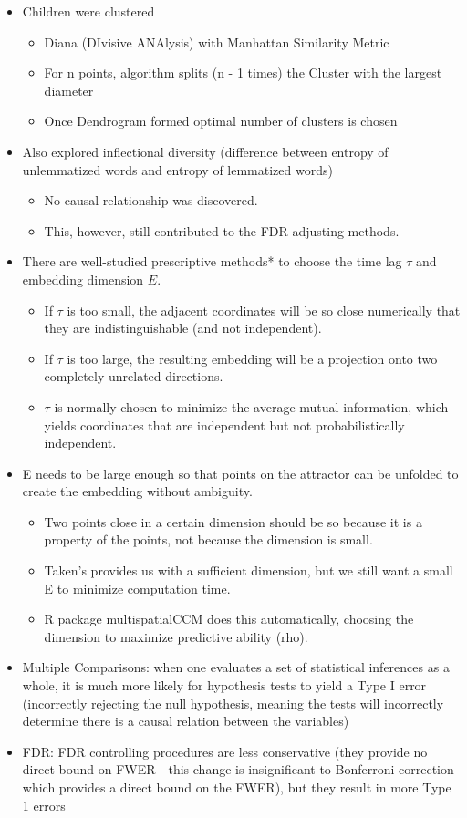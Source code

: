 \documentclass[10pt,a4paper]{article}
\begin{document}
\begin{itemize}
\item Children were clustered
\begin{itemize}
\item Diana (DIvisive ANAlysis) with Manhattan Similarity Metric
\item For n points, algorithm splits (n - 1 times) the Cluster with the largest diameter
\item Once Dendrogram formed optimal number of clusters is chosen
\end{itemize}
\item Also explored inflectional diversity (difference between entropy of unlemmatized words and entropy of lemmatized words)
\begin{itemize}
\item No causal relationship was discovered.
\item This, however, still contributed to the FDR adjusting methods.
\end{itemize}
\item There are well-studied prescriptive methods* to choose the time lag $\tau$ and embedding dimension $E$.
\begin{itemize}
\item If $\tau$ is too small, the adjacent coordinates will be so close numerically that they are indistinguishable (and not independent).
\item If $\tau$ is too large, the resulting embedding will be a projection onto two completely unrelated directions.
\item $\tau$ is normally chosen to minimize the average mutual information, which yields coordinates that are independent but not probabilistically independent.
\end{itemize}
\item E needs to be large enough so that points on the attractor can be unfolded to create the embedding without ambiguity.
\begin{itemize}
\item Two points close in a certain dimension should be so because it is a property of the points, not because the dimension is small.
\item Taken’s provides us with a sufficient dimension, but we still want a small E to minimize computation time.
\item R package multispatialCCM does this automatically, choosing the dimension to maximize predictive ability (rho).
\end{itemize}

\item Multiple Comparisons: when one evaluates a set of statistical inferences as a whole, it is much more likely for hypothesis tests to yield a Type I error (incorrectly rejecting the null hypothesis, meaning the tests will incorrectly determine there is a causal relation between the variables)
\item FDR: FDR controlling procedures are less conservative (they provide no direct bound on FWER - this change is insignificant to Bonferroni correction which provides a direct bound on the FWER), but they result in more Type 1 errors

\end{itemize}
\end{document}

